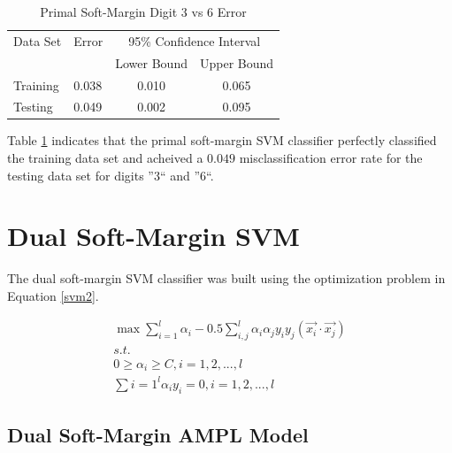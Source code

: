\documentclass{article}
\begin{document}
\begin{table}\label{table1}
\caption{Primal Soft-Margin Digit 3 vs 6 Error}
\begin{center}
\begin{tabular}{llcc}
\toprule
Data Set & Error & \multicolumn{2}{c}{95\% Confidence Interval} \\
\cmidrule(r){3-4}
& & Lower Bound & Upper Bound \\
\midrule
Training & 0.038 & 0.010 & 0.065 \\
Testing & 0.049 & 0.002 & 0.095 \\
\bottomrule
\end{tabular}
\end{center}
\end{table}

Table \ref{table1} indicates that the primal soft-margin SVM classifier perfectly classified the training data set and acheived a \(0.049\) misclassification error rate for the testing data set for digits ''3`` and ''6``.

\section{Dual Soft-Margin SVM}\label{model2}

The dual soft-margin SVM classifier was built using the optimization problem in Equation \ref{svm2}.

\begin{equation}\label{svm2}
\begin{split}
\max \sum_{i=1}^l \alpha_i - 0.5 \sum_{i,j}^l \alpha_i \alpha_j y_i y_j \left( \vec{x_i} \cdot \vec{x_j} \right) \\
s.t. \\
0 \ge \alpha_i \ge C , i = 1,2,...,l \\
\sum{i=1}^l \alpha_i y_i = 0 , i = 1,2,...,l
\end{split}
\end{equation}

\subsection{Dual Soft-Margin AMPL Model}
\end{document}
